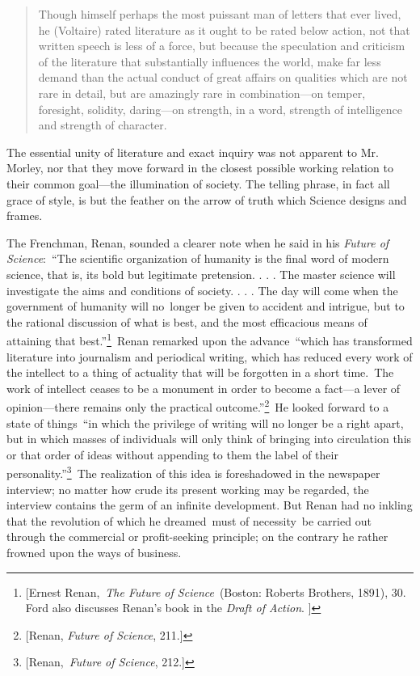 \documentclass[twoside,symmetric,nobib,justified]{tufte-book}
\begin{document}
\begin{quote}
Though himself perhaps the most puissant man of letters that ever lived,
he (Voltaire) rated literature as it ought to be rated below action, not
that written speech is less of a force, but because the speculation and
criticism of the literature that substantially influences the world,
make far less demand than the actual conduct of great affairs on
qualities which are not rare in detail, but are amazingly rare in
combination---on temper, foresight, solidity, daring---on strength, in a
word, strength of intelligence and strength of character.~
\end{quote}

\noindent The essential unity of literature and exact inquiry was not apparent to
Mr. Morley, nor that they move forward in the closest possible working
relation to their common goal---the illumination of society. The telling
phrase, in fact all grace of style, is but the feather on the arrow of
truth which Science designs and frames.~

The Frenchman, Renan, sounded a clearer note when he said in his
\emph{Future of Science}:~``The scientific organization of humanity is
the final word of modern science, that is, its bold but legitimate
pretension. . . . The master science will investigate the aims and
conditions of society. . . . The day will come when the government of
humanity will no~longer be given to accident and intrigue, but to the
rational discussion of what is best, and the most efficacious means of
attaining that best.''\footnote{{[}Ernest Renan,~\emph{The Future of
  Science}~(Boston: Roberts Brothers, 1891), 30. Ford also discusses
  Renan's book in the \emph{Draft of Action}. {]}}~Renan remarked upon
the advance~``which has transformed literature into journalism and
periodical writing, which has reduced every work of the intellect to a
thing of actuality that will be forgotten in a short time.~The work of
intellect ceases to be a monument in order to become a fact---a lever of
opinion---there remains only the practical outcome.''\footnote{{[}Renan,
  \emph{Future of Science}, 211.{]}}~He looked forward to a state of
things~``in which the privilege of writing will no longer be a right
apart, but in which masses of individuals will only think of bringing
into circulation this or that order of ideas without appending to them
the label of their personality.''\footnote{{[}Renan,~\emph{Future of
  Science}, 212.{]}}~The realization of this idea is foreshadowed in the
newspaper interview; no matter how crude its present working may be
regarded, the interview contains the germ of an infinite development.
But Renan had no inkling that the revolution of which he dreamed~must of
necessity~be carried out through the commercial or profit-seeking
principle; on the contrary he rather frowned upon the ways of business.~
\end{document}
